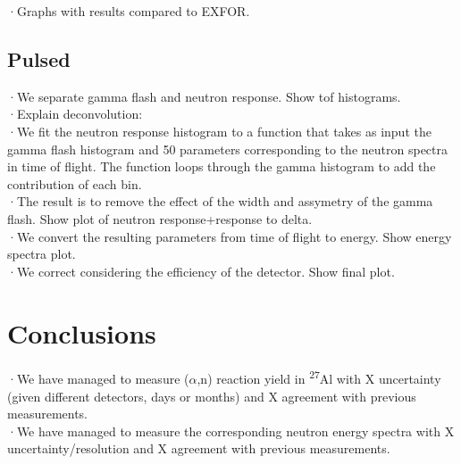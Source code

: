 \documentclass[a4paper,12pt]{report}
\newcommand{\an}{($\alpha$,n) }
\newcommand{\Aliso}{\textsuperscript{27}Al }
\begin{document}
·Graphs with results compared to EXFOR.\\

\section{Pulsed}
·We separate gamma flash and neutron response. Show tof histograms.\\
·Explain deconvolution:\\
·We fit the neutron response histogram to a function that takes as input the gamma flash histogram and 50 parameters corresponding to the neutron spectra in time of flight. The function loops through the gamma histogram to add the contribution of each bin.\\
·The result is to remove the effect of the width and assymetry of the gamma flash. Show plot of neutron response+response to delta.\\

·We convert the resulting parameters from time of flight to energy. Show energy spectra plot.\\
·We correct considering the efficiency of the detector. Show final plot.\\


\chapter{Conclusions}
·We have managed to measure \an reaction yield in \Aliso with X uncertainty (given different detectors, days or months) and X agreement with previous measurements.\\
·We have managed to measure the corresponding neutron energy spectra with X uncertainty/resolution and X agreement with previous measurements.\\
\end{document}
